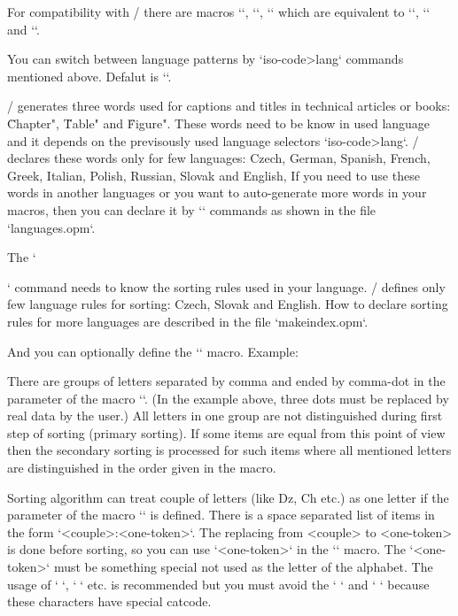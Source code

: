 {For compatibility with \csplain/ there are macros `\ehyph`, `\chyph`,
`\shyph` which are equivalent to `\enlang`, `\cslang` and `\sklang`.

You can switch between language patterns by `\<iso-code>lang` commands mentioned
above. Defalut is `\enlang`.

\OpTeX/ generates three words used for captions and titles in technical
articles or books: \"Chapter", \"Table" and \"Figure". These words need to be know
in used language and it depends on the previsously used language selectors
`\<iso-code>lang`. \OpTeX/ declares these words only for few languages:
\new
Czech, German, Spanish, French, Greek, Italian, Polish, Russian, Slovak and 
English, If you need to use these words in another languages or you want to
auto-generate more words in your macros, then you can declare it by 
`\sdef` commands as shown in the file `languages.opm`.

The `\makeindex` command needs to know the sorting rules used in your language.
\OpTeX/ defines only few language rules for sorting: Czech,
Slovak and English. How to declare sorting rules for more languages are
described in the file `makeindex.opm`.

\iffalse
And you can optionally
define the `` macro. Example:

\begtt
\def\sortingdataes {aAäÄáÁ,bB,cCçÇ,^^P^^Q^^R,dD,...,zZ,.}
\def\specsortingdataes {ch:^^P Ch:^^Q CH:^^R}
\endtt

There are groups of letters separated by comma and ended by comma-dot in
the parameter of the macro ``. (In the example above, three dots must
be replaced by real data by the user.) All letters in one group are not
distinguished during first step of sorting (primary sorting). If some items
are equal from this point of view then the secondary sorting is processed
for such items where all mentioned letters are distinguished in the order
given in the macro. 

Sorting algorithm can treat couple of letters (like Dz, Ch etc.) as one letter 
if the parameter of the macro `` is defined. There is
a space separated list of items in the form `<couple>:<one-token>`. The
replacing from <couple> to <one-token> is done before sorting, so you can
use `<one-token>` in the `` macro. The `<one-token>`
must be something special not used as the letter of the alphabet. The usage of
`^^A`, `^^B` etc. is recommended but you must avoid the `^^I` and `^^M` because
these characters have special catcode.

}
